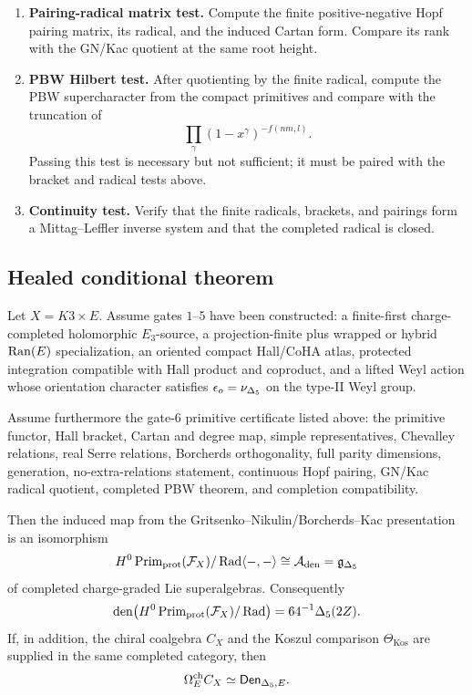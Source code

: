 \begin{enumerate}
\item \textbf{Pairing-radical matrix test.}  Compute the finite
positive-negative Hopf pairing matrix, its radical, and the induced
Cartan form.  Compare its rank with the GN/Kac quotient at the same
root height.

\item \textbf{PBW Hilbert test.}  After quotienting by the finite
radical, compute the PBW supercharacter from the compact primitives and
compare with the truncation of
\[
\prod_{\gamma}(1-x^\gamma)^{-f(nm,l)}.
\]
Passing this test is necessary but not sufficient; it must be paired
with the bracket and radical tests above.

\item \textbf{Continuity test.}  Verify that the finite radicals,
brackets, and pairings form a Mittag--Leffler inverse system and that
the completed radical is closed.
\end{enumerate}

\subsection{Healed conditional theorem}

\begin{theorem}
Let \(X=K3\times E\).  Assume gates \(1\)--\(5\) have been constructed:
a finite-first charge-completed holomorphic \(E_3\)-source, a
projection-finite plus wrapped or hybrid \(\operatorname{Ran}(E)\) specialization, an
oriented compact Hall/CoHA atlas, protected integration compatible with
Hall product and coproduct, and a lifted Weyl action whose orientation
character satisfies \(\epsilon_o=\nu_{\Delta_5}\) on the type-II Weyl group.

Assume furthermore the gate-\(6\) primitive certificate listed above:
the primitive functor, Hall bracket, Cartan and degree map, simple
representatives, Chevalley relations, real Serre relations, Borcherds
orthogonality, full parity dimensions, generation, no-extra-relations
statement, continuous Hopf pairing, GN/Kac radical quotient, completed
PBW theorem, and completion compatibility.

Then the induced map from the Gritsenko--Nikulin/Borcherds--Kac
presentation is an isomorphism
\[
   H^0\operatorname{Prim}_{\mathrm{prot}}(\mathcal F_X)/\operatorname{Rad}\langle-,-\rangle
   \cong
   \mathcal A_{\mathrm{den}}
   =
   \mathfrak g_{\Delta_5}
\]
of completed charge-graded Lie superalgebras.  Consequently
\[
   \operatorname{den}
   \bigl(H^0\operatorname{Prim}_{\mathrm{prot}}(\mathcal F_X)/\operatorname{Rad}\bigr)
   =
   64^{-1}\Delta_5(2Z).
\]
If, in addition, the chiral coalgebra \(C_X\) and the Koszul comparison
\(\Theta_{\mathrm{Kos}}\) are supplied in the same completed category,
then
\[
   \Omega_E^{\mathrm{ch}} C_X
   \simeq
   \mathsf{Den}_{\Delta_5,E}.
\]
\end{theorem}

